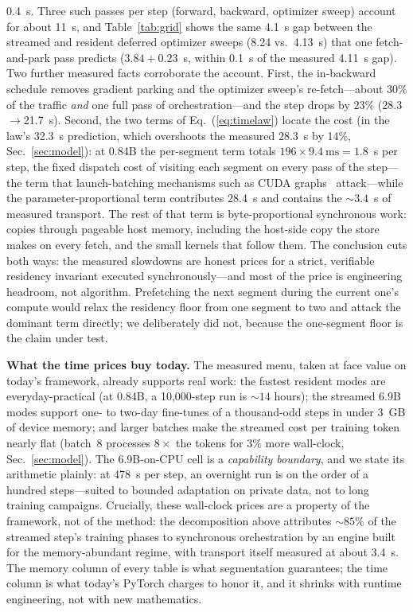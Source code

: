 \documentclass[journal]{IEEEtran}
\begin{document}
0.4~s. Three such passes per step (forward, backward, optimizer sweep)
account for about 11~s, and Table~\ref{tab:grid} shows the same 4.1~s gap
between the streamed and resident deferred optimizer sweeps (8.24 vs.\
4.13~s) that one fetch-and-park pass predicts ($3.84 + 0.23$~s, within 0.1~s
of the measured 4.11~s gap). Two
further measured facts corroborate the account. First, the in-backward schedule removes gradient
parking and the optimizer sweep's re-fetch---about $30\%$ of the traffic
\emph{and} one full pass of orchestration---and the step drops by $23\%$
(28.3${\to}$21.7~s). Second, the two terms of Eq.~(\ref{eq:timelaw}) locate the cost (in the
law's 32.3~s prediction, which overshoots the measured 28.3~s by 14\%,
Sec.~\ref{sec:model}): at 0.84B the per-segment term totals $196 \times 9.4~\text{ms} = 1.8$~s per step,
the fixed dispatch cost of visiting each segment on every pass of the
step---the term that
launch-batching mechanisms such as CUDA graphs~\cite{cudagraphs} attack---while the
parameter-proportional term contributes 28.4~s and contains the
${\sim}3.4$~s of measured transport. The rest of that term is byte-proportional synchronous
work: copies through pageable host memory, including the host-side copy
the store makes on every fetch, and the small kernels that follow them. The conclusion cuts both ways: the
measured slowdowns are honest prices for a strict, verifiable residency
invariant executed synchronously---and most of the price is engineering
headroom, not algorithm. Prefetching the next segment during the current
one's compute would relax the residency floor from one segment to two and
attack the dominant term directly; we deliberately did not, because the
one-segment floor is the claim under test.

\textbf{What the time prices buy today.} The measured menu, taken at
face value on today's framework, already supports real work: the fastest
resident modes are everyday-practical (at 0.84B, a 10{,}000-step run is
${\sim}14$ hours); the streamed 6.9B modes support one- to two-day
fine-tunes of a thousand-odd steps in under 3~GB of device memory; and
larger batches make the streamed cost per training token nearly flat
(batch~8 processes $8\times$ the tokens for $3\%$ more wall-clock,
Sec.~\ref{sec:model}). The 6.9B-on-CPU cell is a \emph{capability
boundary}, and we state its arithmetic plainly: at 478~s per step, an
overnight run is on the order of a hundred steps---suited to bounded
adaptation on private data, not to long training campaigns. Crucially,
these wall-clock prices are a property of the framework, not of the
method: the decomposition above attributes ${\sim}85\%$ of the streamed
step's training phases to synchronous orchestration by an engine built for the
memory-abundant regime, with transport itself measured at about 3.4~s. The memory
column of every table is what segmentation guarantees; the time column is
what today's PyTorch charges to honor it, and it shrinks with runtime
engineering, not with new mathematics.
\end{document}
